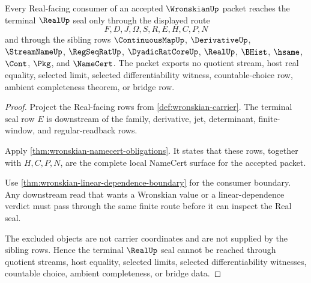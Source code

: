 \begin{theorem}
\label{thm:wronskian-real-seal-nonescape}
Every Real-facing consumer of an accepted $\WronskianUp$ packet reaches the terminal $\RealUp$ seal only through the displayed route
$$
F,D,J,\Omega,S,R,E,H,C,P,N
$$
and through the sibling rows $\ContinuousMapUp$, $\DerivativeUp$, $\StreamNameUp$, $\RegSeqRatUp$, $\DyadicRatCoreUp$, $\RealUp$, $\BHist$, $\hsame$, $\Cont$, $\Pkg$, and $\NameCert$. The packet exports no quotient stream, host real equality, selected limit, selected differentiability witness, countable-choice row, ambient completeness theorem, or bridge row.
\end{theorem}
\begin{proof}
Project the Real-facing rows from \autoref{def:wronskian-carrier}. The terminal seal row $E$ is downstream of the family, derivative, jet, determinant, finite-window, and regular-readback rows.

Apply \autoref{thm:wronskian-namecert-obligations}. It states that these rows, together with $H,C,P,N$, are the complete local NameCert surface for the accepted packet.

Use \autoref{thm:wronskian-linear-dependence-boundary} for the consumer boundary. Any downstream read that wants a Wronskian value or a linear-dependence verdict must pass through the same finite route before it can inspect the Real seal.

The excluded objects are not carrier coordinates and are not supplied by the sibling rows. Hence the terminal $\RealUp$ seal cannot be reached through quotient streams, host equality, selected limits, selected differentiability witnesses, countable choice, ambient completeness, or bridge data.
\end{proof}

